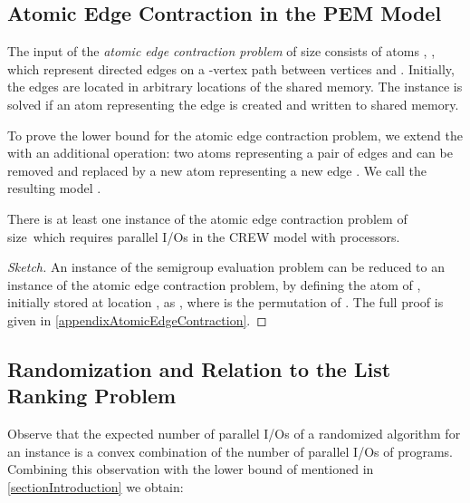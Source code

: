 \documentclass[envcountsame]{llncs}
\def\bOm#1{\printmath{\Omega \left(#1\right)}}
\begin{document}
\subsection{Atomic Edge Contraction in the PEM Model} 
\label{sectionListRankingLB}



\begin{definition}
The input of the {\em atomic edge contraction problem} of size  consists of atoms , , which represent directed edges  on a -vertex path between vertices  and . Initially, the edges are located in arbitrary locations of the shared memory.
The instance is solved if an atom representing the edge  is created and written to shared memory.
\end{definition}

To prove the lower bound for the atomic edge contraction problem, we extend the \movePEM with an additional operation: 
two atoms representing a pair of edges  and  can be removed and replaced by a new atom representing a new edge .
We call the resulting model {\em \bridgingPEM}.





\begin{theorem} 
\label{lemmaAtomicEdgeContraction}
There is at least one instance of the atomic edge contraction problem of size~ which requires \bOm{\permp{\inputSize,\memorySize,\blockSize}} parallel I/Os in the CREW \bridgingPEM model with  processors.
\end{theorem}



\begin{proof}[Sketch]
An instance \instSE of the semigroup evaluation problem can be reduced to an instance \instanceAtomicListRanking of the atomic edge contraction problem, by defining the atom  of \instanceAtomicListRanking, initially stored at location , as \mbox{}, where \perm{} is the permutation of \instSE. 
The full proof is given in \autoref{appendixAtomicEdgeContraction}.
\end{proof}

 


\subsection{Randomization and Relation to the List Ranking Problem}
Observe that the expected number of parallel I/Os of a randomized algorithm for an instance is a convex combination of the number of parallel I/Os of programs. 
Combining this observation with the \bOm{\log P} lower bound of \cite{1990KarpRamachandranPRAMListRankLB,2008ArgeEtAlFundamentalPEM} mentioned in \autoref{sectionIntroduction} we obtain:
\end{document}

